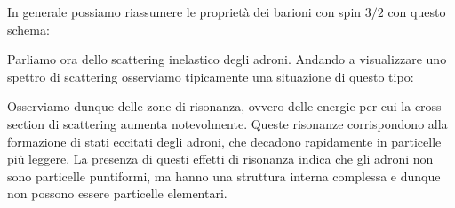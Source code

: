 In generale possiamo riassumere le proprietà dei barioni con spin $3/2$ con questo schema:


Parliamo ora dello scattering inelastico degli adroni. Andando a visualizzare uno spettro di scattering osserviamo tipicamente una situazione di questo tipo:


Osserviamo dunque delle zone di risonanza, ovvero delle energie per cui la cross section di scattering aumenta notevolmente. Queste risonanze corrispondono alla formazione di stati eccitati degli adroni, che decadono rapidamente in particelle più leggere. La presenza di questi effetti di risonanza indica che gli adroni non sono particelle puntiformi, ma hanno una struttura interna complessa e dunque non possono essere particelle elementari.\\
